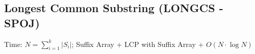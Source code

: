 \subsection{Longest Common Substring (LONGCS - SPOJ)}

Time: $N = \sum_{i = 1}^k |S_i|$; Suffix Array + LCP with Suffix Array + $O(N \cdot \log N)$
